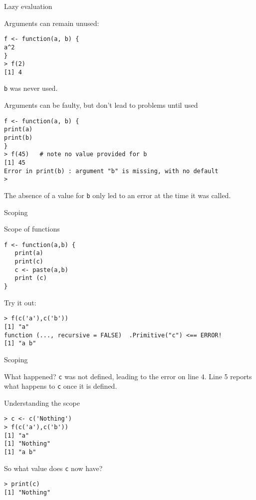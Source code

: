 \documentclass[xcolor=table,compress]{beamer}
\begin{document}
\begin{frame}[fragile]{Lazy evaluation}
\begin{block}{Arguments can remain unused:}

\begin{lstlisting}[numbers=none]
f <- function(a, b) {
a^2
}
> f(2)
[1] 4
\end{lstlisting}
\texttt{b} was never used.
\end{block}
\pause
\begin{block}{Arguments can be faulty, but don't lead to problems until used }
\begin{lstlisting}[numbers=none]
f <- function(a, b) {
print(a)
print(b)
}
> f(45)   # note no value provided for b
[1] 45
Error in print(b) : argument "b" is missing, with no default
>
\end{lstlisting}
The absence of a value for \texttt{b} only led to an error at the time it was called.
\end{block}
\end{frame}

\begin{frame}[fragile]{Scoping}
\begin{block}{Scope of functions}

\begin{lstlisting}[numbers=none]
f <- function(a,b) {
   print(a)
   print(c)
   c <- paste(a,b)
   print (c)
}
\end{lstlisting}
\lstset{numbers=left}
Try it out:\pause
\begin{lstlisting}
> f(c('a'),c('b'))
[1] "a"
function (..., recursive = FALSE)  .Primitive("c") <== ERROR!
[1] "a b"
\end{lstlisting}
\end{block}
\end{frame}

\begin{frame}[fragile]{Scoping}
\begin{block}{What happened?}
\texttt{c} was not defined, leading to the error on line 4. Line 5 reports what happens to \texttt{c} once it is defined.
\end{block}
\begin{block}{Understanding the scope}
\begin{lstlisting}[firstnumber=last]
> c <- c('Nothing')
> f(c('a'),c('b'))
[1] "a"
[1] "Nothing"
[1] "a b"
\end{lstlisting}
So what value does \texttt{c} now have?\pause
\begin{lstlisting}[firstnumber=last]
> print(c)
[1] "Nothing"
\end{lstlisting}
\end{block}
\end{frame}
\end{document}
